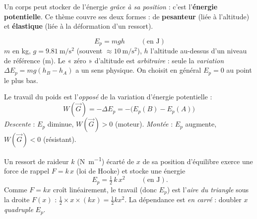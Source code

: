 \documentclass[11pt,a4paper]{article}
\newcommand{\vv}[1]{\vec{#1}}\newcommand{\ds}{\displaystyle}
\begin{document}

Un corps peut stocker de l'énergie \emph{grâce à sa position} : c'est l'\textbf{énergie potentielle}.
Ce thème couvre ses deux formes : de \textbf{pesanteur} (liée à l'altitude) et \textbf{élastique}
(liée à la déformation d'un ressort).

\begin{cle}
\[
\boxed{\;E_p=mgh\;}\qquad(\text{en }\si{\joule})
\]
$m$ en \si{\kilogram}, $g=\qty{9,81}{\metre\per\second\squared}$ (souvent $\approx\qty{10}{\metre\per\second\squared}$),
$h$ l'altitude au-dessus d'un niveau de référence (\si{\metre}). Le « zéro » d'altitude est
\emph{arbitraire} : seule la \emph{variation} $\Delta E_p=mg(h_B-h_A)$ a un sens physique. On choisit
en général $E_p=0$ au point le plus bas.
\end{cle}

\begin{cle}
Le travail du poids est l'\emph{opposé} de la variation d'énergie potentielle :
\[
\boxed{\;W(\vv G)=-\Delta E_p=-\bigl(E_p(B)-E_p(A)\bigr)\;}
\]
\emph{Descente} : $E_p$ diminue, $W(\vv G)>0$ (moteur). \emph{Montée} : $E_p$ augmente, $W(\vv G)<0$
(résistant).
\end{cle}

\begin{cle}
Un ressort de raideur $k$ (\si{\newton\per\metre}) écarté de $x$ de sa position d'équilibre exerce une
force de rappel $F=k\,x$ (loi de Hooke) et stocke une énergie
\[
\boxed{\;E_p=\tfrac12\,k\,x^2\;}\qquad(\text{en }\si{\joule}).
\]
Comme $F=kx$ croît linéairement, le travail (donc $E_p$) est l'\emph{aire du triangle} sous la droite
$F(x)$ : $\tfrac12\times x\times(kx)=\tfrac12 kx^2$. La dépendance est \emph{en carré} : doubler $x$
\emph{quadruple} $E_p$.
\end{cle}

\begin{center}
\end{center}
\end{document}
